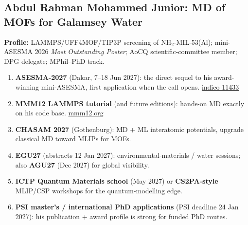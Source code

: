 \documentclass[11pt,a4paper]{article}
\begin{document}
\subsection{Abdul Rahman Mohammed Junior: MD of MOFs for Galamsey Water}
\textbf{Profile:} LAMMPS/UFF4MOF/TIP3P screening of NH$_2$-MIL-53(Al); mini-ASESMA 2026 \emph{Most Outstanding Poster}; AoC\textbar Q scientific-committee member; DPG delegate; MPhil--PhD track.
\begin{enumerate}[leftmargin=1.6em]
  \item \textbf{ASESMA-2027} (Dakar, 7--18 Jun 2027): the direct sequel to his award-winning mini-ASESMA, first application when the call opens. \href{https://indico.ictp.it/event/11433}{indico 11433}
  \item \textbf{MMM12 LAMMPS tutorial} (and future editions): hands-on MD exactly on his code base. \href{https://www.mmm12.org/tutorial-sessions/}{mmm12.org}
  \item \textbf{CHASAM 2027} (Gothenburg): MD + ML interatomic potentials, upgrade classical MD toward MLIPs for MOFs.
  \item \textbf{EGU27} (abstracts 12 Jan 2027): environmental-materials / water sessions; also \textbf{AGU27} (Dec 2027) for global visibility.
  \item \textbf{ICTP Quantum Materials school} (May 2027) or \textbf{CS2PA-style} MLIP/CSP workshops for the quantum-modelling edge.
  \item \textbf{PSI master's / international PhD applications} (PSI deadline 24 Jan 2027): his publication + award profile is strong for funded PhD routes.
\end{enumerate}
\end{document}
